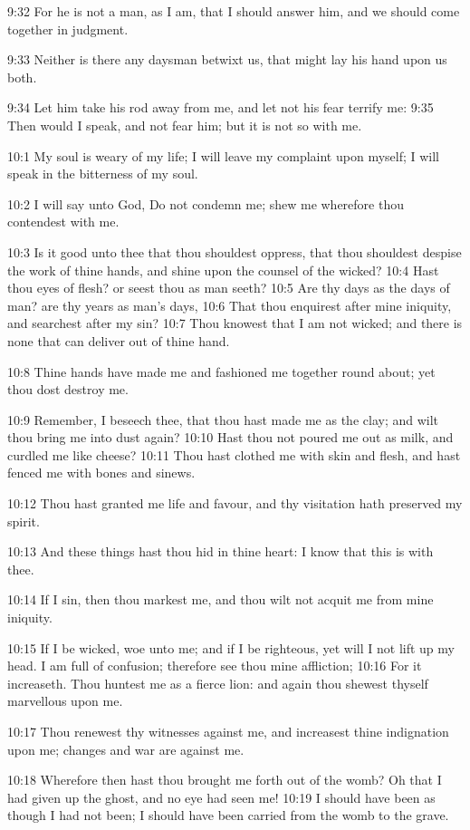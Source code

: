 9:32 For he is not a man, as I am, that I should answer him, and we
should come together in judgment.

9:33 Neither is there any daysman betwixt us, that might lay his hand
upon us both.

9:34 Let him take his rod away from me, and let not his fear terrify
me: 9:35 Then would I speak, and not fear him; but it is not so with
me.

10:1 My soul is weary of my life; I will leave my complaint upon
myself; I will speak in the bitterness of my soul.

10:2 I will say unto God, Do not condemn me; shew me wherefore thou
contendest with me.

10:3 Is it good unto thee that thou shouldest oppress, that thou
shouldest despise the work of thine hands, and shine upon the counsel
of the wicked?  10:4 Hast thou eyes of flesh? or seest thou as man
seeth?  10:5 Are thy days as the days of man? are thy years as man's
days, 10:6 That thou enquirest after mine iniquity, and searchest
after my sin?  10:7 Thou knowest that I am not wicked; and there is
none that can deliver out of thine hand.

10:8 Thine hands have made me and fashioned me together round about;
yet thou dost destroy me.

10:9 Remember, I beseech thee, that thou hast made me as the clay; and
wilt thou bring me into dust again?  10:10 Hast thou not poured me out
as milk, and curdled me like cheese?  10:11 Thou hast clothed me with
skin and flesh, and hast fenced me with bones and sinews.

10:12 Thou hast granted me life and favour, and thy visitation hath
preserved my spirit.

10:13 And these things hast thou hid in thine heart: I know that this
is with thee.

10:14 If I sin, then thou markest me, and thou wilt not acquit me from
mine iniquity.

10:15 If I be wicked, woe unto me; and if I be righteous, yet will I
not lift up my head. I am full of confusion; therefore see thou mine
affliction; 10:16 For it increaseth. Thou huntest me as a fierce lion:
and again thou shewest thyself marvellous upon me.

10:17 Thou renewest thy witnesses against me, and increasest thine
indignation upon me; changes and war are against me.

10:18 Wherefore then hast thou brought me forth out of the womb? Oh
that I had given up the ghost, and no eye had seen me!  10:19 I should
have been as though I had not been; I should have been carried from
the womb to the grave.

